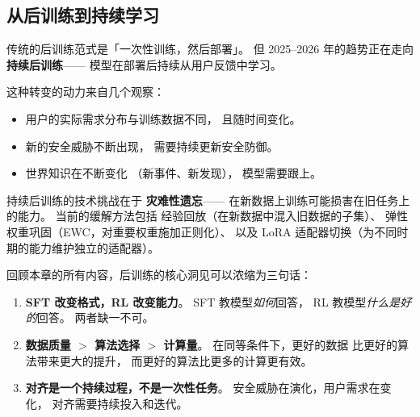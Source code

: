 \subsection{从后训练到持续学习}

传统的后训练范式是「一次性训练，然后部署」。
但 2025--2026 年的趋势正在走向\textbf{持续后训练}——
模型在部署后持续从用户反馈中学习。

这种转变的动力来自几个观察：
\begin{itemize}[noitemsep]
  \item 用户的实际需求分布与训练数据不同，
        且随时间变化。
  \item 新的安全威胁不断出现，
        需要持续更新安全防御。
  \item 世界知识在不断变化
       （新事件、新发现），
        模型需要跟上。
\end{itemize}

持续后训练的技术挑战在于
\textbf{灾难性遗忘}——
在新数据上训练可能损害在旧任务上的能力。
当前的缓解方法包括
经验回放（在新数据中混入旧数据的子集）、
弹性权重巩固（EWC，对重要权重施加正则化）、
以及 LoRA 适配器切换（为不同时期的能力维护独立的适配器）。

\begin{keybox}[后训练的核心洞见]
回顾本章的所有内容，后训练的核心洞见可以浓缩为三句话：
\begin{enumerate}[noitemsep]
  \item \textbf{SFT 改变格式，RL 改变能力}。
        SFT 教模型\emph{如何}回答，
        RL 教模型\emph{什么是好的}回答。
        两者缺一不可。
  \item \textbf{数据质量 $>$ 算法选择 $>$ 计算量}。
        在同等条件下，更好的数据
        比更好的算法带来更大的提升，
        而更好的算法比更多的计算更有效。
  \item \textbf{对齐是一个持续过程，不是一次性任务}。
        安全威胁在演化，用户需求在变化，
        对齐需要持续投入和迭代。
\end{enumerate}
\end{keybox}


